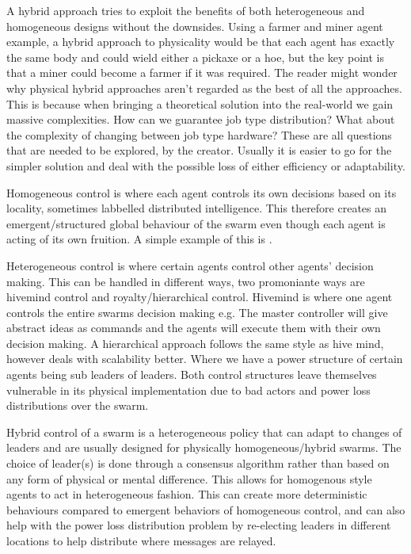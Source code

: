 \documentclass{UoYCSproject}
\begin{document}
A hybrid approach tries to exploit the benefits of both heterogeneous and homogeneous designs without the downsides.
Using a farmer and miner agent example, a hybrid approach to physicality would be that each agent has exactly the same body and could wield either a pickaxe or a hoe, but the key point is that a miner could become a farmer if it was required.
The reader might wonder why physical hybrid approaches aren’t regarded as the best of all the approaches.
This is because when bringing a theoretical solution into the real-world we gain massive complexities.
How can we guarantee job type distribution?
What about the complexity of changing between job type hardware?
These are all questions that are needed to be explored, by the creator.
Usually it is easier to go for the simpler solution and deal with the possible loss of either efficiency or adaptability.

Homogeneous control is where each agent controls its own decisions based on its locality, sometimes labbelled distributed intelligence.
This therefore creates an emergent/structured global behaviour of the swarm even though each agent is acting of its own fruition.
A simple example of this is \cite{Boids}.

Heterogeneous control is where certain agents control other agents' decision making.
This can be handled in different ways, two promoniante ways are hivemind control \cite{HiveMind} and royalty/hierarchical control.
Hivemind is where one agent controls the entire swarms decision making e.g. The master controller will give abstract ideas as commands and the agents will execute them with their own decision making.
A hierarchical approach follows the same style as hive mind, however deals with scalability better.
Where we have a power structure of certain agents being sub leaders of leaders.
Both control structures leave themselves vulnerable in its physical implementation due to bad actors and power loss distributions over the swarm.

Hybrid control of a swarm is a heterogeneous policy that can adapt to changes of leaders and are usually designed for physically homogeneous/hybrid swarms.
The choice of leader(s) is done through a consensus algorithm \cite{Paxos} rather than based on any form of physical or mental difference.
This allows for homogenous style agents to act in heterogeneous fashion.
This can create more deterministic behaviours compared to emergent behaviors of homogeneous control, and can also help with the power loss distribution problem by re-electing leaders in different locations to help distribute where messages are relayed.
\end{document}
